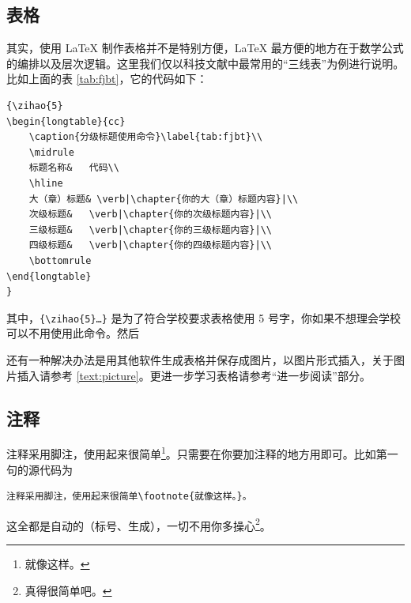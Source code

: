 \subsection{表格}
其实，使用 \LaTeX{} 制作表格并不是特别方便，\LaTeX{} 最方便的地方在于数学公式的编排以及层次逻辑。这里我们仅以科技文献中最常用的“三线表”为例进行说明。比如上面的表 \ref{tab:fjbt}，它的代码如下：
\begin{Verbatim}[frame=single]
{\zihao{5}
\begin{longtable}{cc}
	\caption{分级标题使用命令}\label{tab:fjbt}\\
	\midrule
	标题名称&	代码\\
	\hline
	大（章）标题&	\verb|\chapter{你的大（章）标题内容}|\\
	次级标题&	\verb|\chapter{你的次级标题内容}|\\
	三级标题&	\verb|\chapter{你的三级标题内容}|\\
	四级标题&	\verb|\chapter{你的四级标题内容}|\\
	\bottomrule
\end{longtable}
}
\end{Verbatim}
其中，\verb|{\zihao{5}…}| 是为了符合学校要求表格使用 5 号字，你如果不想理会学校可以不用使用此命令。然后

还有一种解决办法是用其他软件生成表格并保存成图片，以图片形式插入，关于图片插入请参考 \ref{text:picture}。更进一步学习表格请参考“进一步阅读”部分。

\subsection{注释}
注释采用脚注，使用起来很简单\footnote{就像这样。}。只需要在你要加注释的地方用即可。比如第一句的源代码为
\begin{Verbatim}[frame=single]
注释采用脚注，使用起来很简单\footnote{就像这样。}。
\end{Verbatim}
这全都是自动的（标号、生成），一切不用你多操心\footnote{真得很简单吧。}。

